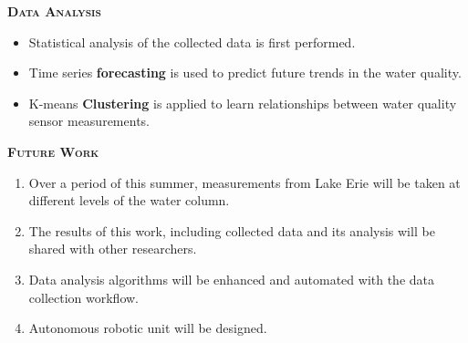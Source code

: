 \documentclass[final,t]{beamer}
\begin{document}
\begin{frame}{}
\begin{columns}
\begin{column}{.33\linewidth}
\begin{block}{\textsc{\textbf{Data Analysis}}}
\begin{center}
\begin{figure}
                    \end{figure}
                    \end{center}
                    \begin{itemize}
                    	\item Statistical analysis of the collected data is first performed.
                    	\item Time series \textbf{forecasting} is used to predict future trends in the water quality.
                    	\item K-means \textbf{Clustering} is applied to learn relationships between water quality sensor measurements.   
                    \end{itemize}

                    \vspace*{3mm}
                \end{block}

                \begin{alertblock}{\textsc{\textbf{Future Work}}}
                    \vspace*{3mm}
                    \begin{enumerate}
                    	\item Over a period of this summer, measurements from Lake Erie will be taken at
                      different levels of the water column.
                    	\item The results of this work, including collected data and its analysis will be shared with other researchers.
                      	\item Data analysis algorithms will be enhanced and automated with the data collection workflow.
                      	\item Autonomous robotic unit will be designed. 
                    \end{enumerate}

                    \vspace*{3mm}
                \end{alertblock}
            \end{column}

        \end{columns}
    \end{frame}
\end{document}
